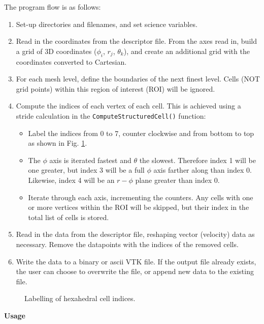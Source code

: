 \documentclass[twocolumn]{aastex62}
\begin{document}
The program flow is as follows:
\begin{enumerate}
	\item Set-up directories and filenames, and set science variables.
	\item Read in the coordinates from the descriptor file. From the axes read in, build a grid of 3D coordinates ($\phi_{i}$, $r_{j}$, $\theta_{k}$), and create an additional grid with the coordinates converted to Cartesian. 
	\item For each mesh level, define the boundaries of the next finest level. Cells (NOT grid points) within this region of interest (ROI) will be ignored.
	\item Compute the indices of each vertex of each cell. This is achieved using a stride calculation in the \verb|ComputeStructuredCell()| function:	
	\begin{itemize}
		 \item Label the indices from 0 to 7, counter clockwise and from bottom to top as shown in Fig. \ref{fig:cube}.
		 \item The $\phi$ axis is iterated fastest and $\theta$ the slowest. Therefore index 1 will be one greater, but index 3 will be a full $\phi$ axis farther along than index 0. Likewise, index 4 will be an $r-\phi$ plane greater than index 0.
		 \item Iterate through each axis, incrementing the counters. Any cells with one or more vertices within the ROI will be skipped, but their index in the total list of cells is stored.
 	\end{itemize}
	\item Read in the data from the descriptor file, reshaping vector (velocity) data as necessary. Remove the datapoints with the indices of the removed cells.
	\item Write the data to a binary or ascii VTK file. If the output file already exists, the user can choose to overwrite the file, or append new data to the existing file.
\end{enumerate}
\begin{figure}[t]
	\centering
{}
\caption{\label{fig:cube} Labelling of hexahedral cell indices.}
\end{figure}
\textbf{Usage}
\end{document}
